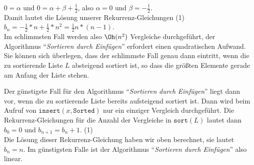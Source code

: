 \hspace*{1.3cm} $0 = \alpha$ \quad und \quad $\displaystyle 0 = \alpha + \beta + \frac{1}{2}$, \quad also \quad  $\alpha = 0$ \quad und \quad $\beta = - \frac{1}{2}$.  
\\[0.1cm]
Damit lautet die L\"osung unserer Rekurrenz-Gleichungen (1) \\[0.1cm]
\hspace*{1.3cm} 
$\displaystyle b_n = -\frac{1}{2} * n + \frac{1}{2} * n^2 = \frac{1}{2} n*(n-1)$. \\[0.1cm]
Im schlimmsten Fall werden also $\Oh(n^2)$ Vergleiche durchgef\"uhrt, der Algorithmus 
``\emph{Sortieren durch Einf\"ugen}'' erfordert einen quadratischen Aufwand.
Sie k\"onnen sich \"uberlegen, dass der schlimmste Fall genau dann eintritt, wenn die zu
sortierende Liste $L$ absteigend sortiert ist, so dass die gr\"o\ss{}ten Elemente gerade am
Anfang der Liste stehen.

Der g\"unstigste Fall f\"ur den Algorithmus ``\emph{Sortieren durch Einf\"ugen}'' liegt dann
vor, wenn die zu sortierende Liste bereits aufsteigend sortiert ist.  Dann wird beim
Aufruf von $\mathtt{insert}(x,\mathtt{Sorted})$ nur ein einziger Vergleich durchgef\"uhrt.
Die Rekurrenz-Gleichungen f\"ur die Anzahl der Vergleiche in $\mathtt{sort}(L)$ lautet dann \\[0.1cm]
\hspace*{1.3cm} $b_0 = 0$ \quad und \quad $b_{n+1} = b_n + 1$. \hspace*{\fill} (1)\\[0.1cm]
Die L\"osung dieser Rekurrenz-Gleichung haben wir oben berechnet, sie lautet $b_n = n$.
Im g\"unstigsten Falle ist der Algorithmus ``\emph{Sortieren durch Einf\"ugen}'' also linear.
\pagebreak

